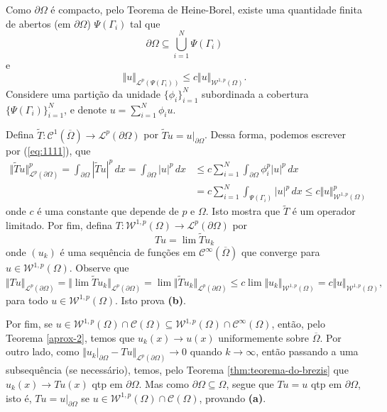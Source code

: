 \documentclass[a4paper, 11pt]{book}
\theoremstyle{definition}
\newcommand{\cC}{\mathcal{C}}
\newcommand{\cL}{\mathcal{L}}
\newcommand{\cW}{\mathcal{W}}
\begin{document}
\begin{prf}
    Como $\partial\Omega$ é compacto, pelo Teorema de Heine-Borel, existe uma quantidade finita de abertos (em $\partial \Omega$) $\Psi(\Gamma_i)$ tal que
    \[
        \partial\Omega \subseteq \bigcup_{i=1}^N \Psi(\Gamma_i)
    \]
    e
    \begin{equation} \label{eq:1111}
        \Vert u \Vert_{\cL^p(\Psi(\Gamma_i))} \leqslant c \Vert u \Vert_{\cW^{1,p}(\Omega)}.
    \end{equation}
    Considere uma partição da unidade $\{\phi_i\}_{i=1}^N$ subordinada a cobertura $\{\Psi(\Gamma_i)\}_{i=1}^N$, e denote $u = \sum_{i=1}^N \phi_i u$.

    Defina $\widetilde T : \cC^1(\overline \Omega) \to \cL^p(\partial\Omega)$ por $\widetilde T u = u |_{\partial \Omega}$.
    Dessa forma, podemos escrever por (\ref{eq:1111}), que
    \begin{equation} \label{eq:2222}
        \begin{aligned}
            \Vert \widetilde Tu \Vert_{\cL^p(\partial \Omega)}^p = \int_{\partial\Omega} | \widetilde T u|^p \,dx = \int_{\partial\Omega} |u|^p \,dx &\leqslant c \sum_{i=1}^{N} \int_{\partial \Omega} \phi_i^p |u|^p \,dx\\ 
            &= c \sum_{i=1}^N \int_{\Psi(\Gamma_i)} |u|^p \,dx \leqslant c\Vert u \Vert_{\cW^{1,p}(\Omega)}^p
        \end{aligned}
    \end{equation}
    onde $c$ é uma constante que depende de $p$ e $\Omega$. Isto mostra que $\widetilde T$ é um operador limitado.
    Por fim, defina $T : \cW^{1,p}(\Omega) \to \cL^p(\partial \Omega)$ por
    \[
        T u = \lim \widetilde T u_k
    \]
    onde $(u_k)$ é uma sequência de funções em $\cC^{\infty}(\overline\Omega)$ que converge para $u \in \cW^{1,p}(\Omega)$. 
    Observe que
    \[
        \Vert Tu \Vert_{\cL^p(\partial \Omega)} = \Vert \lim \widetilde T u_k \Vert_{\cL^p(\partial \Omega)} = \lim \Vert \widetilde T u_k \Vert_{\cL^p(\partial \Omega)} \leqslant c \lim \Vert u_k \Vert_{\cW^{1,p}(\Omega)} = c \Vert u \Vert_{\cW^{1,p}(\Omega)},
    \]
    para todo $u \in \cW^{1,p}(\Omega)$. Isto prova \textbf{(b)}.

    Por fim, se $u \in \cW^{1,p}(\Omega) \cap \cC(\Omega) \subseteq \cW^{1,p}(\Omega) \cap \cC^\infty(\Omega)$, então, pelo Teorema \ref{aprox-2}, temos que $u_k(x) \to u(x)$ uniformemente sobre $\overline\Omega$.
    Por outro lado, como $\Vert u_k |_{\partial\Omega} - Tu \Vert_{\cL^p(\partial \Omega)} \to 0$ quando $k \to \infty$, então passando a uma subsequência (se necessário), temos, pelo Teorema \ref{thm:teorema-do-brezis} que $u_k(x) \to Tu(x)$ qtp em $\partial \Omega$.
    Mas como $\partial \Omega \subseteq \Omega$, segue que $Tu = u$ qtp em $\partial \Omega$, isto é, $Tu = u|_{\partial\Omega}$ se $u \in \cW^{1,p}(\Omega) \cap \cC(\Omega)$, provando \textbf{(a)}.
\end{prf}
\end{document}
